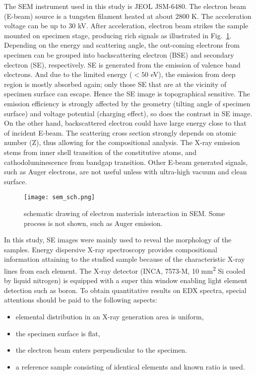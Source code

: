 The SEM instrument used in this study is JEOL JSM-6480. The electron beam (E-beam) source is a tungsten filament heated at about 2800 K. The acceleration voltage can be up to 30 kV. After acceleration, electron beam strikes the sample mounted on specimen stage, producing rich signals as illustrated in Fig.~\ref{fig:ch2sem}. Depending on the energy and scattering angle, the out-coming electrons from specimen can be grouped into backscattering electron (BSE) and secondary electron (SE), respectively. SE is generated from the emission of valence band electrons. And due to the limited energy ($<50$ eV), the emission from deep region is mostly absorbed again; only those SE that are at the vicinity of specimen surface can escape. Hence the SE image is topographical sensitive. The emission efficiency is strongly affected by the geometry (tilting angle of specimen surface) and voltage potential (charging effect), so does the contrast in SE image. On the other hand, backscattered electron could have large energy close to that of incident E-beam. The scattering cross section strongly depends on atomic number (Z), thus allowing for the compositional analysis. The X-ray emission stems from inner shell transition of the constitutive atoms, and cathodoluminescence from bandgap transition. Other E-beam generated signals, such as Auger electrons, are not useful unless with ultra-high vacuum and clean surface.

\begin{figure}[htb]
\centering
\texttt{[image: sem\_sch.png]}
\caption[SEM excitation volume]{schematic drawing of electron materials interaction in SEM. Some process is not shown, such as Auger emission.}
\label{fig:ch2sem}
\end{figure}

In this study, SE images were mainly used to reveal the morphology of the samples. Energy dispersive X-ray spectroscopy provides compositional information attaining to the studied sample because of the characteristic X-ray lines from each element. The X-ray detector (INCA, 7573-M, 10 \si{mm^2} Si cooled by liquid nitrogen) is equipped with a super thin window enabling light element detection such as boron. To obtain quantitative results on EDX spectra, special attentions should be paid to the following aspects:
\begin{itemize}
\item elemental distribution in an X-ray generation area is uniform,
\item the specimen surface is flat,
\item the electron beam enters perpendicular to the specimen. 
\item a reference sample consisting of identical elements and known ratio is used. 
\end{itemize}

